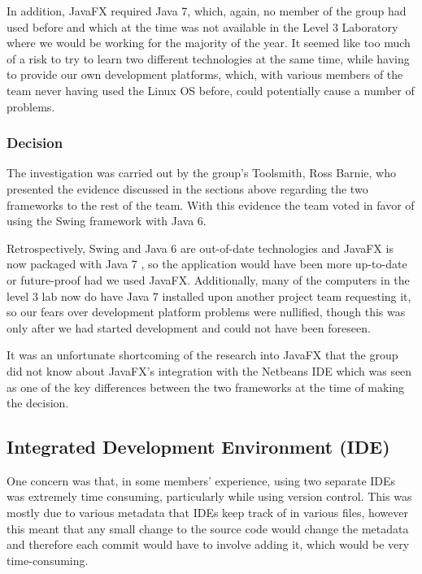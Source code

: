In addition, JavaFX required Java 7, which, again, no member of the
group had used before and which at the time was not available in the
Level 3 Laboratory where we would be working for the majority of the
year.
It seemed like too much of a risk to try to learn two different
technologies at the same time, while having to provide our own
development platforms, which, with various members of the team never
having used the Linux OS before, could potentially cause a number of
problems.


\subsubsection{Decision}
\label{impl:ui:guiframework:decision}

The investigation was carried out by the group's Toolsmith, Ross
Barnie, who presented the evidence discussed in the sections above
regarding the two frameworks to the rest of the team.
With this evidence the team voted in favor of using the Swing
framework with Java 6.

Retrospectively, Swing and Java 6 are out-of-date technologies and
JavaFX is now packaged with Java 7 \cite{javafxOverview}, so the
application would have been more up-to-date or future-proof had we
used JavaFX.
Additionally, many of the computers in the level 3 lab now do have
Java 7 installed upon another project team requesting it, so our fears
over development platform problems were nullified, though this was
only after we had started development and could not have been foreseen.

It was an unfortunate shortcoming of the research into JavaFX that the
group did not know about JavaFX's integration with the Netbeans IDE
which was seen as one of the key differences between the two
frameworks at the time of making the decision.


\subsection{Integrated Development Environment (IDE)}
\label{impl:ui:ide}

One concern was that, in some members' experience, using two separate
IDEs was extremely time consuming, particularly while using version
control.
This was mostly due to various metadata that IDEs keep track of in
various files, however this meant that any small change to the source
code would change the metadata and therefore each commit would have to
involve adding it, which would be very time-consuming.

